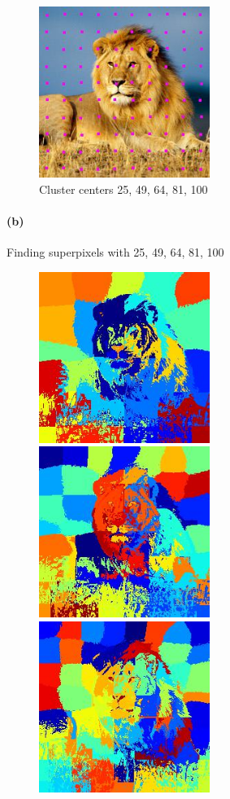 \documentclass{article}
\newcommand{\spart}[1]{\paragraph{(#1)}}
\begin{document}
\begin{figure}[h!]
	\includegraphics[height=15em]{code/outputs/prob1a_100_centers.jpg}
	\caption{Cluster centers 25, 49, 64, 81, 100}
\end{figure}

\newpage
\spart{b} 
Finding superpixels with 25, 49, 64, 81, 100
\begin{figure}[h!]
  \centering
	\includegraphics[height=15em]{code/outputs/prob1b_spatial_weight_0.7/prob1b_25.jpg}
	\includegraphics[height=15em]{code/outputs/prob1b_spatial_weight_0.7/prob1b_49.jpg}
	\includegraphics[height=15em]{code/outputs/prob1b_spatial_weight_0.7/prob1b_64.jpg}

\end{figure}
\end{document}

